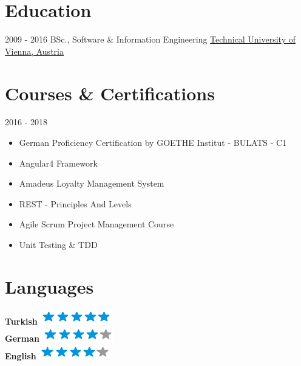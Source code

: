 \documentclass[letterpaper]{twentysecondcv} %
\begin{document}
\makeprofile %

\section{Education}

\begin{twenty} %
	\twentyitem
	    {2009 - 2016}
        {}
        {BSc., Software \& Information Engineering}
        {\href{http://www.tuwien.ac.at}{Technical University of Vienna, Austria}}
        {}
        {}
\end{twenty}

\section{Courses \& Certifications}
\begin{twenty}
	\twentyitem
    	{2016 - 2018}
		{}
        {}
        {}
        {}
        {
        {\begin{itemize}
        \item German Proficiency Certification by GOETHE Institut - BULATS - C1
        \item Angular4 Framework
        \item Amadeus Loyalty Management System
        \item REST - Principles And Levels
        \item Agile Scrum Project Management Course
        \item Unit Testing \& TDD

        \vspace{2mm}
		\end{itemize}}
        }
\end{twenty}

\section{Languages}
\textbf{Turkish}\includegraphics[scale=0.40]{img/5stars.png} \\
    \textbf{German}\includegraphics[scale=0.40]{img/4stars.png} \\
    \textbf{English}\includegraphics[scale=0.40]{img/4stars.png} \vspace{2mm}
\end{document}
